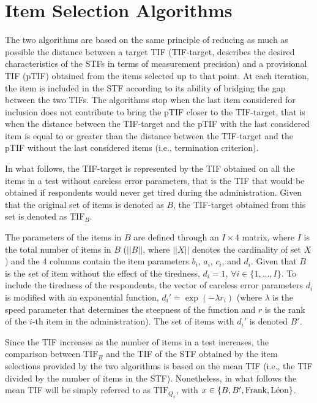 \documentclass{svproc}
\begin{document}
\section{Item Selection Algorithms}



The two algorithms are based on the same principle of reducing as much as possible the distance between a target TIF (TIF-target, describes the desired characteristics of the STFs in terms of measurement precision) and a provisional TIF (pTIF) obtained from the items selected up to that point. 
At each iteration, the item is included in the STF according to its ability of bridging the gap between the two TIFs. 
The algorithms stop when the last item considered for inclusion does not contribute to bring the pTIF closer to the TIF-target, that is when the distance between the TIF-target and the pTIF with the last considered item is equal to or greater than the distance between the TIF-target and the pTIF without the last considered items (i.e., termination criterion). 

In what follows, the TIF-target is represented by the TIF obtained on all the items in a test without careless error parameters, that is the TIF that would be obtained if respondents would never get tired during the administration. Given that the original set of items is denoted as $B$, the TIF-target obtained from this set is denoted as $\text{TIF}_B$.

The parameters of the items in $B$ are defined through an $I \times 4$ matrix, where $I$ is the total number of items in $B$ ($||B||$, where $||X||$ denotes the cardinality of set $X$) and the 4 columns contain the item parameters $b_i$, $a_i$, $c_i$, and $d_i$. 
Given that $B$ is the set of item without the effect of the tiredness, $d_i = 1$, $\forall i \in \{1, \ldots, I\}$. To include the tiredness of the respondents, the vector of careless error parameters $d_i$ is modified with an exponential function, $d_i' = \exp(-\lambda r_i)$ (where $\lambda$ is the speed parameter that determines the steepness of the function and $r$ is the rank of the $i$-th item in the administration).
The set of items with $d_i'$ is denoted $B'$.

Since the TIF increases as the number of items in a test increases, the comparison between $\text{TIF}_B$ and the TIF of the STF obtained by the item selections provided by the two algorithms is based on the mean TIF (i.e., the TIF divided by the number of items in the STF). Nonetheless, in what follows the mean TIF will be simply referred to as $\text{TIF}_{Q_x}$, with $x \in \{B, B', \text{Frank}, \text{\text{Léon}}\}$.
\end{document}

